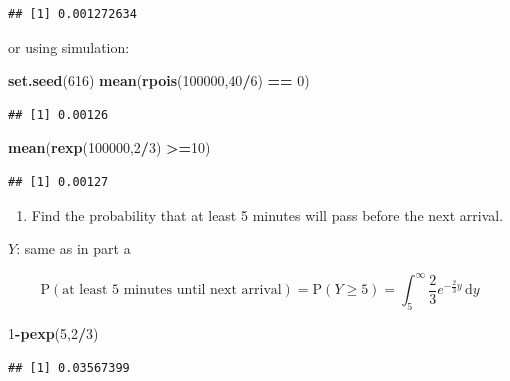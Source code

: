 \documentclass[
]{book}
\newenvironment{Shaded}{\begin{snugshade}}{\end{snugshade}}
\newcommand{\DecValTok}[1]{\textcolor[rgb]{0.00,0.00,0.81}{#1}}
\newcommand{\KeywordTok}[1]{\textcolor[rgb]{0.13,0.29,0.53}{\textbf{#1}}}
\newcommand{\NormalTok}[1]{#1}
\newcommand{\OperatorTok}[1]{\textcolor[rgb]{0.81,0.36,0.00}{\textbf{#1}}}
\newcommand{\StringTok}[1]{\textcolor[rgb]{0.31,0.60,0.02}{#1}}
\providecommand{\tightlist}{%
  \setlength{\itemsep}{0pt}\setlength{\parskip}{0pt}}
\begin{document}
\begin{verbatim}
## [1] 0.001272634
\end{verbatim}

or using simulation:

\begin{Shaded}
\begin{Highlighting}[]
\KeywordTok{set.seed}\NormalTok{(}\DecValTok{616}\NormalTok{)}
\KeywordTok{mean}\NormalTok{(}\KeywordTok{rpois}\NormalTok{(}\DecValTok{100000}\NormalTok{,}\DecValTok{40}\OperatorTok{/}\DecValTok{6}\NormalTok{) }\OperatorTok{==}\StringTok{ }\DecValTok{0}\NormalTok{)}
\end{Highlighting}
\end{Shaded}

\begin{verbatim}
## [1] 0.00126
\end{verbatim}

\begin{Shaded}
\begin{Highlighting}[]
\KeywordTok{mean}\NormalTok{(}\KeywordTok{rexp}\NormalTok{(}\DecValTok{100000}\NormalTok{,}\DecValTok{2}\OperatorTok{/}\DecValTok{3}\NormalTok{) }\OperatorTok{>=}\DecValTok{10}\NormalTok{)}
\end{Highlighting}
\end{Shaded}

\begin{verbatim}
## [1] 0.00127
\end{verbatim}

\begin{enumerate}
\def\labelenumi{\alph{enumi}.}
\setcounter{enumi}{1}
\tightlist
\item
  Find the probability that at least 5 minutes will pass before the next arrival.
\end{enumerate}

\(Y\): same as in part a

\[
\mbox{P}(\mbox{at least 5 minutes until next arrival})=\mbox{P}(Y\geq 5)=\int_{5}^\infty \frac{2}{3}e^{-\frac{2}{3}y}\,\mathrm{d}y
\]

\begin{Shaded}
\begin{Highlighting}[]
\DecValTok{1}\OperatorTok{-}\KeywordTok{pexp}\NormalTok{(}\DecValTok{5}\NormalTok{,}\DecValTok{2}\OperatorTok{/}\DecValTok{3}\NormalTok{)}
\end{Highlighting}
\end{Shaded}

\begin{verbatim}
## [1] 0.03567399
\end{verbatim}
\end{document}
